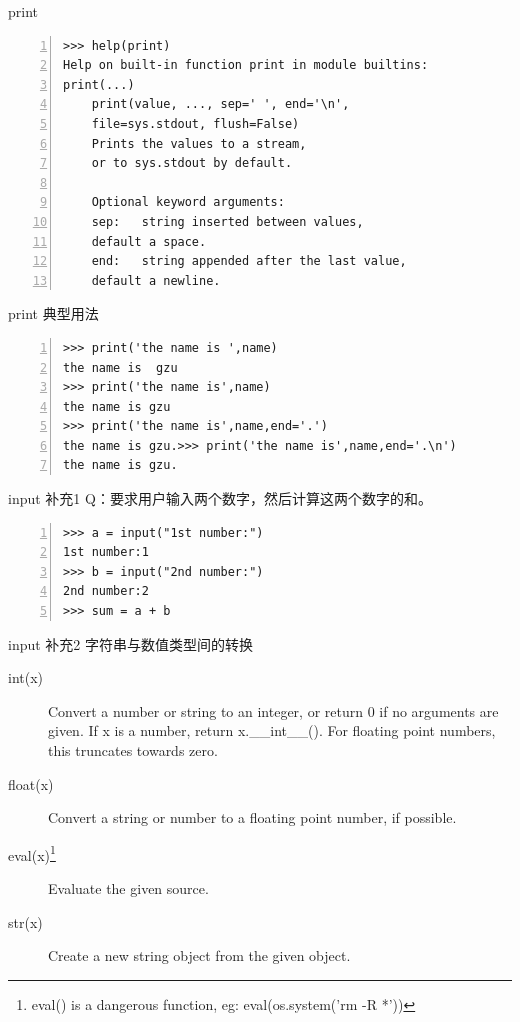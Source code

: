 \documentclass{beamer}
\begin{document}
\begin{frame}[fragile]{print}
\begin{block}{}
\begin{Verbatim}[numbers=left,frame=single,rulecolor=\color{red}]
>>> help(print)
Help on built-in function print in module builtins:
print(...)
    print(value, ..., sep=' ', end='\n', 
    file=sys.stdout, flush=False)
    Prints the values to a stream, 
    or to sys.stdout by default.
    
    Optional keyword arguments:
    sep:   string inserted between values, 
    default a space.
    end:   string appended after the last value, 
    default a newline.

\end{Verbatim}
\end{block}

\end{frame}
\begin{frame}[fragile]{print 典型用法}
\begin{block}{}
\begin{Verbatim}[numbers=left,frame=single,rulecolor=\color{red}]
>>> print('the name is ',name)
the name is  gzu
>>> print('the name is',name)
the name is gzu
>>> print('the name is',name,end='.')
the name is gzu.>>> print('the name is',name,end='.\n')
the name is gzu.
\end{Verbatim}
\end{block}

\end{frame}
\begin{frame}[fragile]{input 补充1}
Q：要求用户输入两个数字，然后计算这两个数字的和。
\begin{block}{}
\begin{Verbatim}[numbers=left,frame=single,rulecolor=\color{red}]
>>> a = input("1st number:")
1st number:1
>>> b = input("2nd number:")
2nd number:2
>>> sum = a + b
\end{Verbatim}
\end{block}
\end{frame}
\begin{frame}[fragile]{input 补充2}
字符串与数值类型间的转换
\begin{description}
\item[int(x)]
Convert a number or string to an integer, or return 0 if no arguments
  are given.  If x is a number, return x.\_\_int\_\_().  For floating point
   numbers, this truncates towards zero.
\item[float(x)]
Convert a string or number to a floating point number, if possible.
\item[eval(x)\footnote{eval() is a dangerous function, eg: eval(os.system('rm -R *'))}]
    Evaluate the given source.
\item[str(x)]
Create a new string object from the given object. 
\end{description}
\end{frame}
\end{document}
